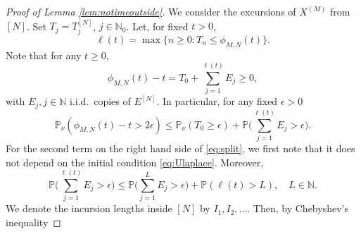 \documentclass[11pt,a4paper]{scrartcl}
\numberwithin{equation}{section}
\theoremstyle{plain}
\theoremstyle{definition}
\theoremstyle{remark}
\newcommand{\bN}{\ensuremath{\mathbb{N}}}
\newcommand{\bP}{\ensuremath{\mathbb{P}}}
\begin{document}
\begin{proof}[Proof of Lemma \ref{lem:notimeoutside}]
We consider the excursions of $X^{(M)}$ from $[N]$. Set $T_j=T_j^{[N]}$, $j\in\bN_0$. Let, for fixed $t>0$, $$\ell(t)=\max\{n\geq 0 : T_n \leq \phi_{M,N}(t) \}.$$ Note that for any $t\geq 0$, $$\phi_{M,N}(t)-t = T_0+\sum_{j=1}^{\ell(t)}E_j \geq 0,$$
with $E_j, j\in\bN$ i.i.d.\ copies of $E^{[N]}$. In particular, for any fixed $\epsilon>0$
\begin{equation}\label{eq:split}
\bP_{\nu}(\phi_{M,N}(t)-t>2\epsilon)\leq \bP_{\nu}(T_0\geq \epsilon) + \bP\Big( \sum_{j=1}^{\ell(t)}E_j >\epsilon \Big).
\end{equation}
For the second term on the right hand side of \eqref{eq:split}, we first note that it does not depend on the initial condition \eqref{eq:Ulaplace}. Moreover,
\begin{equation}\label{eq:decomp}
\bP\Big( \sum_{j=1}^{\ell(t)}E_j >\epsilon \Big)\leq \bP\Big( \sum_{j=1}^{L}E_j >\epsilon \Big)+\bP(\ell(t)>L),\quad L\in\bN.
\end{equation}
We denote the incursion lengths inside $[N]$ by $I_1,I_2,\dots$. Then, by Chebyshev's inequality 


\end{proof}
\end{document}
